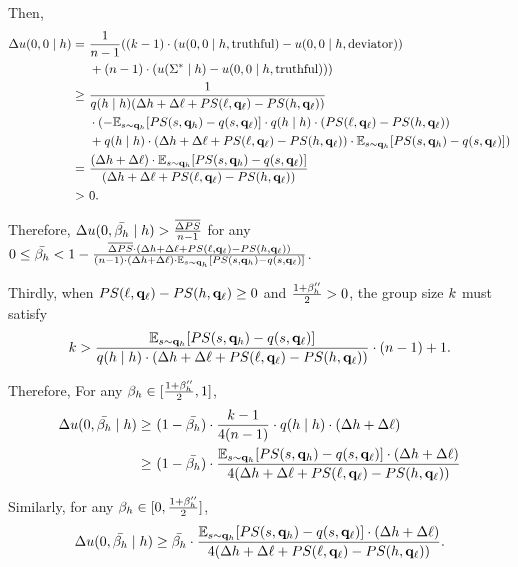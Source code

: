 Then, 
\begin{align*}
    \Delta u(0, 0 \mid h) = &\ \frac{1}{n - 1} ((k - 1)\cdot (u(0, 0\mid h, \text{truthful}) -  u(0, 0\mid h, \text{deviator}))\\
    &\ + (n - 1)\cdot (u(\Sigma^* \mid h) -  u(0, 0\mid h, \text{truthful})))\\
    \ge &\ \frac{1}{q(h \mid h)(\Delta h + \Delta \ell + PS(\ell, \mathbf{q}_{\ell}) - PS(h, \mathbf{q}_\ell))}\\
    &\ \cdot (-\mathbb{E}_{s \sim \mathbf{q}_h}[PS(s, \mathbf{q}_h) - q(s, \mathbf{q}_\ell)] \cdot q(h \mid h) \cdot (PS(\ell, \mathbf{q}_\ell) - PS(h, \mathbf{q}_\ell))\\
    &\ + q(h\mid h)\cdot (\Delta h + \Delta \ell + PS(\ell, \mathbf{q}_{\ell}) - PS(h, \mathbf{q}_\ell)) \cdot \mathbb{E}_{s \sim \mathbf{q}_h}[PS(s, \mathbf{q}_h) - q(s, \mathbf{q}_\ell)])\\
    =&\  \frac{(\Delta h + \Delta \ell) \cdot \mathbb{E}_{s \sim \mathbf{q}_h}[PS(s, \mathbf{q}_h) - q(s, \mathbf{q}_\ell)]}{(\Delta h + \Delta \ell + PS(\ell, \mathbf{q}_{\ell}) - PS(h, \mathbf{q}_\ell))}\\
    > &\ 0. 
\end{align*}

Therefore,  $\Delta u(0, \bar{\beta_{h}} \mid h) > \frac{\overline{\Delta PS}}{ n - 1}$ for any $0 \le  \bar{\beta_{h}} < 1 - \frac{\overline{\Delta PS}\cdot (\Delta h + \Delta \ell + PS(\ell, \mathbf{q}_{\ell}) - PS(h, \mathbf{q}_\ell))}{ (n - 1)\cdot (\Delta h +\Delta \ell)\cdot  \mathbb{E}_{s \sim \mathbf{q}_h}[PS(s, \mathbf{q}_h) - q(s, \mathbf{q}_\ell)]}$. 

Thirdly, when $PS(\ell, \mathbf{q}_{\ell}) - PS(h, \mathbf{q}_\ell) \ge 0$ and $\frac{1 + \beta_{h}''}{2} > 0$, the group size $k$ must satisfy
\begin{equation*}
    k > \frac{\mathbb{E}_{s \sim \mathbf{q}_h}[PS(s, \mathbf{q}_h) - q(s, \mathbf{q}_\ell)]}{q(h\mid h) \cdot (\Delta h + \Delta \ell + PS(\ell, \mathbf{q}_{\ell}) - PS(h, \mathbf{q}_\ell))}\cdot (n-1) + 1. 
\end{equation*}

Therefore, For any $\beta_{h} \in [\frac{1 + \beta_{h}''}{2}, 1]$, 
\begin{align*}
   \Delta u(0, \bar{\beta_{h}} \mid h) \ge&\  (1 - \bar{\beta_{h}}) \cdot \frac{k - 1}{4(n - 1)}\cdot q(h\mid h)\cdot (\Delta h + \Delta \ell)\\
   \ge &\ (1 - \bar{\beta_{h}}) \cdot  \frac{\mathbb{E}_{s \sim \mathbf{q}_h}[PS(s, \mathbf{q}_h) - q(s, \mathbf{q}_\ell)]\cdot (\Delta h + \Delta \ell)}{4 (\Delta h + \Delta \ell + PS(\ell, \mathbf{q}_{\ell}) - PS(h, \mathbf{q}_\ell))}
\end{align*}

Similarly, for any $\beta_{h} \in [0, \frac{1 + \beta_{h}''}{2}]$, 
\begin{equation*}
   \Delta u(0, \bar{\beta_{h}} \mid h)
   \ge \bar{\beta_{h}} \cdot  \frac{\mathbb{E}_{s \sim \mathbf{q}_h}[PS(s, \mathbf{q}_h) - q(s, \mathbf{q}_\ell)]\cdot (\Delta h + \Delta \ell)}{4 (\Delta h + \Delta \ell + PS(\ell, \mathbf{q}_{\ell}) - PS(h, \mathbf{q}_\ell))}.
\end{equation*}

